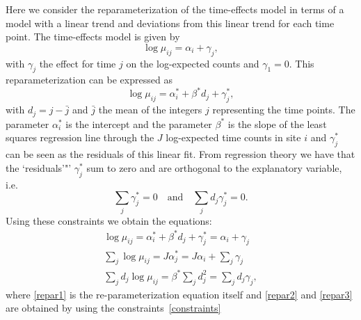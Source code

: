 \documentclass[a4paper]{article}
\begin{document}
Here we consider the reparameterization of the time-effects model in terms of
a model with a linear trend and deviations from this linear trend for each time point.
The time-effects model is given by
\begin{equation}
  \log\mu_{ij}=\alpha_i+\gamma_j,
\end{equation}
with $\gamma_j$ the effect for time $j$ on the log-expected counts and $\gamma_1=0$. This reparameterization can be expressed as
\begin{equation}
  \log\mu_{ij}=\alpha^*_i+\beta^*d_j+\gamma^*_j,
\end{equation}
with $d_j=j-\bar{j}$ and $\bar{j}$ the mean of the integers $j$ representing
the time points.
The parameter $\alpha^*_i$ is the intercept and the parameter $\beta^*$ is
the slope of the least squares regression line through the $J$ log-expected
time counts in site $i$ and  $\gamma^*_j$ can be seen as the residuals of this
linear fit.
From regression theory we have that the `residuals'"'  $\gamma^*_j$ sum to zero
and are orthogonal to the explanatory variable, i.e.
\begin{equation}
  \sum_j\gamma^*_j = 0 \quad \text{and} \quad \sum_jd_j\gamma^*_j = 0. \label{constraints}
\end{equation}
Using these constraints we obtain the equations:
\begin{gather}
  \log\mu_{ij}           = \alpha^*_i+\beta^*d_j+\gamma^*_j=\alpha_i+\gamma_j  \label{repar1}\\
  \sum_j \log\mu_{ij}    = J\alpha^*_j = J\alpha_i+\sum_j\gamma_j \label{repar2}\\
  \sum_j d_j\log\mu_{ij} = \beta^*\sum_jd^2_j = \sum_jd_j\gamma_j \label{repar3},
\end{gather}
where \eqref{repar1} is the re-parameterization equation itself and \eqref{repar2}
and \eqref{repar3} are obtained by using the constraints~\eqref{constraints}\par
\end{document}
